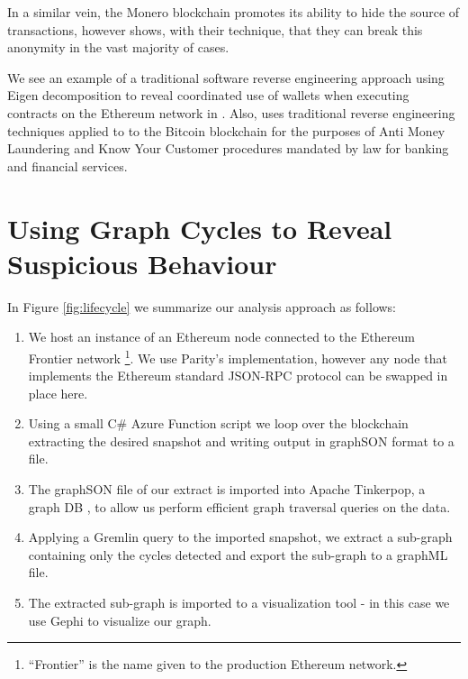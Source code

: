 \documentclass[conference]{IEEEtran}
\begin{document}
In a similar vein, the Monero blockchain  promotes its ability to hide the source of transactions, however \cite{kumar2017traceability} shows, with their technique, that they can break this anonymity in the vast majority of cases. 

We see an example of a traditional software reverse engineering approach using Eigen decomposition to reveal coordinated use of wallets when executing contracts on the Ethereum network in \cite{ghassemi2018reverse}. Also, \cite{moser2013inquiry} uses traditional reverse engineering techniques applied to to the Bitcoin blockchain for the purposes of Anti Money Laundering and Know Your Customer procedures mandated by law for banking and financial services.



\section{Using Graph Cycles to Reveal Suspicious Behaviour} \label{ourapproach}


In Figure \ref{fig:lifecycle} we summarize our analysis approach as follows:

\begin{enumerate}
    \item We host an instance of an Ethereum node connected to the Ethereum Frontier network \footnote{``Frontier'' is the name given to the production Ethereum network.}.  We use Parity's implementation, however any node that implements the Ethereum standard JSON-RPC protocol \cite{kalodner2017blocksci} can be swapped in place here.
    \item Using a small C\# Azure Function \cite{vijayakumar2018serverless} script we loop over the blockchain extracting the desired snapshot and writing output in graphSON \cite{tomaszuk2016rdf} format to a file.
    \item The graphSON file of our extract is imported into Apache Tinkerpop, a graph DB \cite{jouili2013empirical}, to allow us perform efficient graph traversal queries on the data.
    \item Applying a Gremlin query to the imported snapshot, we extract a sub-graph containing only the cycles detected and export the sub-graph to a graphML \cite{brandes2013graph} file.
    \item The extracted sub-graph is imported to a visualization tool - in this case we use Gephi \cite{bastian2009gephi} to visualize our graph.
    
\end{enumerate}
\end{document}
